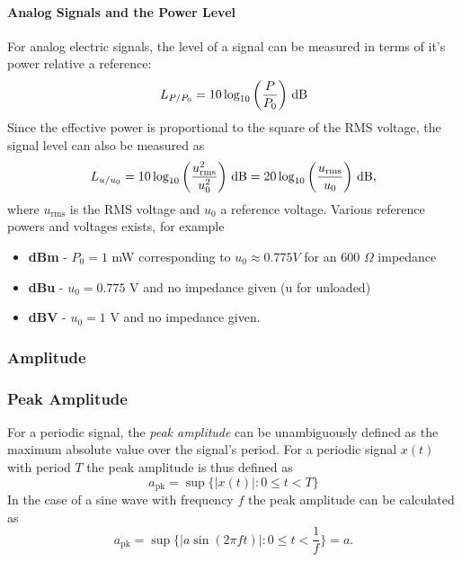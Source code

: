 \documentclass[../main2.tex]{subfiles}
\begin{document}
\paragraph{Analog Signals and the Power Level}
For analog electric signals, the level of a signal can be measured in terms of it's power relative a reference:
\begin{equation}
L_{P/P_0} = 10 \log_{10} \left( \frac{P}{P_0} \right) \mskip3mu\text{dB}
\end{equation}
Since the effective power is proportional to the square of the RMS voltage, the signal level can also be measured as
\begin{equation}
L_{u/u_0} = 10 \log_{10} \left( \frac{u_\text{rms}^2}{u_0^2} \right) \mskip3mu\text{dB} = 20 \log_{10} \left( \frac{u_\text{rms}}{u_0} \right) \mskip3mu\text{dB},
\end{equation}
where $u_\text{rms}$ is the RMS voltage and $u_0$ a reference voltage. Various reference powers and voltages exists, for example 

\begin{itemize}
\item \textbf{dBm} - $P_0 = 1$ mW corresponding to $u_0 \approx 0.775 V$ for an 600 $\Omega$ impedance
\item \textbf{dBu} - $u_0 = 0.775$ V and no impedance given (u for unloaded)
\item \textbf{dBV} - $u_0 = 1$ V and no impedance given.
\end{itemize}



\subsubsection{Amplitude}

\subsubsection{Peak Amplitude}
For a periodic signal, the \emph{peak amplitude} can be unambiguously defined as the maximum absolute value over the signal's period. For a periodic signal $x(t)$ with period $T$ the peak amplitude is thus defined as
\begin{equation}
a_\text{pk} = \sup \{ |x(t)| :  0 \leq t < T \}
\end{equation}
In the case of a sine wave with frequency $f$ the peak amplitude can be calculated as
\begin{equation}\label{eq:sine_wave}
a_\text{pk} = \sup \{ |a \sin(2 \pi f t) | : 0 \leq t < \frac{1}{f} \} = a.
\end{equation}
\end{document}
